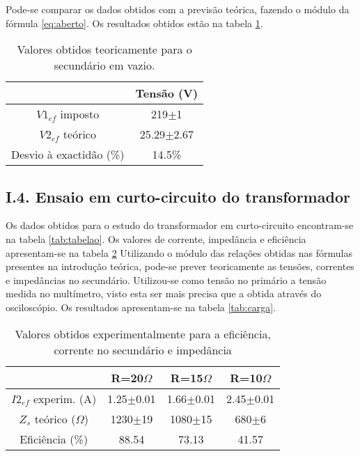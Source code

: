 \documentclass[%
  reprint,
  nofootinbib,
  amsmath,amssymb,
  aps,
  10pt,
]{revtex4-1}
\begin{document}
Pode-se comparar os dados obtidos com a previsão teórica, fazendo o módulo da fórmula \ref{eq:aberto}. Os resultados obtidos estão na tabela \ref{tab:vazio}.
\begin{table}[h]
\begin{tabular}{|c|c|}
                       & Tensão (V)     \\ \hline
$V1_{ef}$  imposto     & 219$\pm$1      \\
$V2_{ef}$ teórico      & 25.29$\pm$2.67 \\
Desvio à exactidão (\%) & 14.5\%        
\end{tabular}
\caption{Valores obtidos teoricamente para o secundário em vazio.}
\label{tab:vazio}
\end{table}

\subsection*{I.4. Ensaio em curto-circuito do transformador}
Os dados obtidos para o estudo do transformador em curto-circuito encontram-se na tabela \ref{tab:tabelao}. Os valores de corrente, impedância e eficiência apresentam-se na tabela \ref{tab:imp} Utilizando o módulo das relações obtidas nas fórmulas presentes na introdução teórica, pode-se prever teoricamente as tensões, correntes e impedâncias no secundário. Utilizou-se como tensão no primário a tensão medida no multímetro, visto esta ser mais precisa que a obtida através do osciloscópio. Os resultados apresentam-se na tabela \ref{tab:carga}.

\begin{table}[h]
\begin{tabular}{c|c|c|c}
                         & R=20$\Omega$  & R=15$\Omega$  & R=10$\Omega$  \\ \hline
$I2_{ef}$ experim. (A)   & 1.25$\pm$0.01 & 1.66$\pm$0.01 & 2.45$\pm$0.01 \\ \hline
$Z_s$ teórico ($\Omega$) & 1230$\pm$19   & 1080$\pm$15   & 680$\pm$6     \\ \hline
Eficiência (\%)          & 88.54         & 73.13         & 41.57        
\end{tabular}
\caption{Valores obtidos experimentalmente para a eficiência, corrente no secundário e impedância}
\label{tab:imp}
\end{table}
\end{document}
